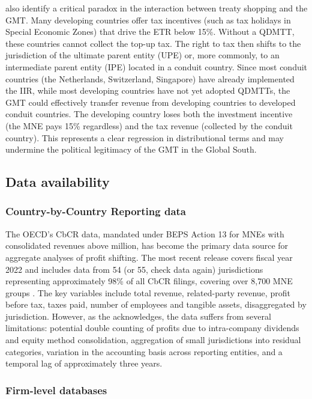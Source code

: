 \documentclass[11pt,a4paper]{article}
\newcommand{\EUR}{\texteuro}
\begin{document}
\citeauthor{vantriet2025} also identify a critical paradox in the interaction between treaty shopping and the GMT. Many developing countries offer tax incentives (such as tax holidays in Special Economic Zones) that drive the ETR below 15\%. Without a QDMTT, these countries cannot collect the top-up tax. The right to tax then shifts to the jurisdiction of the ultimate parent entity (UPE) or, more commonly, to an intermediate parent entity (IPE) located in a conduit country. Since most conduit countries (the Netherlands, Switzerland, Singapore) have already implemented the IIR, while most developing countries have not yet adopted QDMTTs, the GMT could effectively transfer revenue from developing countries to developed conduit countries. The developing country loses both the investment incentive (the MNE pays 15\% regardless) and the tax revenue (collected by the conduit country). This represents a clear regression in distributional terms and may undermine the political legitimacy of the GMT in the Global South.

\subsection{Data availability}\label{sec:data_methods}

\subsubsection{Country-by-Country Reporting data}

The OECD's CbCR data, mandated under BEPS Action 13 for MNEs with consolidated revenues above \EUR 750 million, has become the primary data source for aggregate analyses of profit shifting. The most recent release covers fiscal year 2022 and includes data from 54 (or 55, check data again) jurisdictions representing approximately 98\% of all CbCR filings, covering over 8,700 MNE groups \citep{oecd2025corptaxstats}. The key variables include total revenue, related-party revenue, profit before tax, taxes paid, number of employees and tangible assets, disaggregated by jurisdiction. However, as the \citeauthor{oecd2025corptaxstats} acknowledges, the data suffers from several limitations: potential double counting of profits due to intra-company dividends and equity method consolidation, aggregation of small jurisdictions into residual categories, variation in the accounting basis across reporting entities, and a temporal lag of approximately three years.

\subsubsection{Firm-level databases}
\end{document}
